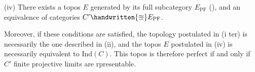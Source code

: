 (iv) There exists a topos $E$ generated by its full subcategory
\reversemarginpar\margin{\handwritten{$\times$}}\normalmarginpar
$E_{\mathrm{PF}}$ (\quad\quad), and an equivalence of categories $C'\handwritten{\approxeq}E_{\mathrm{PF}}$.

Moreover,  if these conditions are satisfied, the topology postulated in (i ter) is necessarily the one described in (ii), and the topos $E$ postulated in (iv) is necessarily equivalent to $\mathrm{Ind}(C)$. This topos is therefore perfect if and only if  $C'$  finite projective limits are rpresentable.
